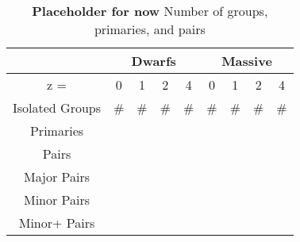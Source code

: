 \documentclass[twocolumn]{aastex63}
\newcommand{\kc}[1]{\textcolor{mypink}{\textbf{#1}} }
\begin{document}
\begin{table*}[htb]
  \begin{center}
\begin{tabular}{ccccc|cccc}
    & \multicolumn{4}{c}{Dwarfs} & \multicolumn{4}{c}{Massive} \\\hline\hline
    z = &0&1&2&4&0&1&2&4 \\ \hline
    Isolated Groups & \# & \# &\# &\#&\#&\#&\#&\#\\
Primaries &  & &&&&&& \\
Pairs &  & &&&&&& \\
Major Pairs &  & &&&&&& \\
Minor Pairs &  & &&&&&& \\
Minor+ Pairs &  & &&&&&& \\\hline
\end{tabular}
\end{center}
\caption{\label{table:counts}\kc{Placeholder for now} Number of groups, primaries, and pairs}
\end{table*}


\end{document}
